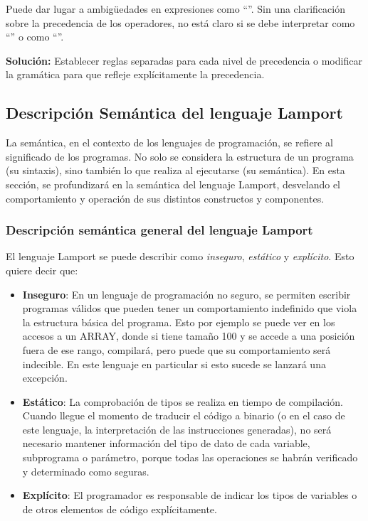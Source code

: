 Puede dar lugar a ambigüedades en expresiones como ``''. Sin una clarificación sobre la precedencia de los operadores, no está claro si se debe interpretar como ``'' o como ``''.



\textbf{Solución:} Establecer reglas separadas para cada nivel de precedencia o modificar la gramática para que refleje explícitamente la precedencia.


\subsection{Descripción Semántica del lenguaje Lamport}\label{subsec:semanticaLamport}

La semántica, en el contexto de los lenguajes de programación, se refiere al significado de los programas. No solo se considera la estructura de un programa (su sintaxis), sino también lo que realiza al ejecutarse (su semántica). En esta sección, se profundizará en la semántica del lenguaje Lamport, desvelando el comportamiento y operación de sus distintos constructos y componentes.

\subsubsection{Descripción semántica general del lenguaje Lamport}
El lenguaje Lamport se puede describir como \textit{inseguro}, \textit{estático} y \textit{explícito}. Esto quiere decir que:

\begin{itemize}
    \item \textbf{Inseguro}: En un lenguaje de programación no seguro, se permiten escribir programas válidos que pueden tener un comportamiento indefinido que viola la estructura básica del programa. Esto por ejemplo se puede ver en los accesos a un ARRAY, donde si tiene tamaño 100 y se accede a una posición fuera de ese rango, compilará, pero puede que su comportamiento será indecible. En este lenguaje en particular si esto sucede se lanzará una excepción.
    \item \textbf{Estático}: La comprobación de tipos se realiza en tiempo de compilación. Cuando llegue el momento de traducir el código a binario (o en el caso de este lenguaje, la interpretación de las instrucciones generadas), no será necesario mantener información del tipo de dato de cada variable, subprograma o parámetro, porque todas las operaciones se habrán verificado y determinado como seguras.
    \item \textbf{Explícito}: El programador es responsable de indicar los tipos de variables o de otros elementos de código explícitamente.
\end{itemize}

